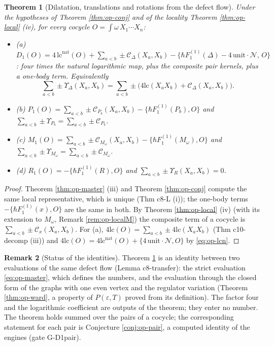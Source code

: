 \documentclass[11pt]{article}
\numberwithin{equation}{section}
\theoremstyle{plain}
\newtheorem{theorem}{Theorem}[section]
\theoremstyle{definition}
\newtheorem{remark}[theorem]{Remark}
\newcommand{\lc}{\mathrm{lc}}
\newcommand{\lcn}{\mathrm{lc}^{\mathrm{nat}}}
\newcommand{\Fc}{\mathcal N}
\newcommand{\Comp}{\mathcal C}
\begin{document}
\begin{theorem}[Dilatation, translations and rotations from the defect flow]
\label{thm:op-a}
Under the hypotheses of Theorem \ref{thm:op-conj} and of the locality Theorem \ref{thm:op-local} (iv), for every cocycle $O=\int\omega\,X_1\cdots X_n$:
\begin{itemize}
\item (a) $D_1(O)=4\,\lcn(O)+\sum_{a<b}\pm\Comp_\Delta(X_a,X_b)-\big\{\hbar F_1^{(1)}(\Delta)-4\,\mathrm{unit}\cdot\Fc,\,O\big\}$: four times the natural logarithmic map, plus the composite pair kernels, plus a one-body term. Equivalently
\begin{equation}
\sum_{a<b}\pm\Upsilon_\Delta(X_a,X_b)=\sum_{a<b}\pm\Big(4\lc(X_aX_b)+\Comp_\Delta(X_a,X_b)\Big).
\label{eq:op-aD}
\end{equation}
\item (b) $P_1(O)=\sum_{a<b}\pm\Comp_{P_b}(X_a,X_b)-\{\hbar F_1^{(1)}(P_b),O\}$ and $\sum_{a<b}\pm\Upsilon_{P_b}=\sum_{a<b}\pm\Comp_{P_b}$.
\item (c) $M_1(O)=\sum_{a<b}\pm\Comp_{M_\omega}(X_a,X_b)-\{\hbar F_1^{(1)}(M_\omega),O\}$ and $\sum_{a<b}\pm\Upsilon_{M_\omega}=\sum_{a<b}\pm\Comp_{M_\omega}$.
\item (d) $R_1(O)=-\{\hbar F_1^{(1)}(R),O\}$ and $\sum_{a<b}\pm\Upsilon_R(X_a,X_b)=0$.
\end{itemize}
\end{theorem}

\begin{proof}
Theorem \ref{thm:op-master} (iii) and Theorem \ref{thm:op-conj} compute the same local representative, which is unique (Thm c8-L (i)); the one-body terms $-\{\hbar F_1^{(1)}(x),O\}$ are the same in both. By Theorem \ref{thm:op-local} (iv) (with its extension to $M_\omega$, Remark \ref{rem:op-localM}) the composite term of a cocycle is $\sum_{a<b}\pm\Comp_x(X_a,X_b)$. For (a), $4\lc(O)=\sum_{a<b}\pm4\lc(X_aX_b)$ (Thm c10-decomp (iii)) and $4\lc(O)=4\lcn(O)+\{4\,\mathrm{unit}\cdot\Fc,O\}$ by \eqref{eq:op-lcn}.
\end{proof}

\begin{remark}[Status of the identities]
\label{rem:op-astatus}
Theorem \ref{thm:op-a} is an identity between two evaluations of the same defect flow (Lemma c8-transfer): the strict evaluation \eqref{eq:op-master}, which defines the numbers, and the evaluation through the closed form of the graphs with one even vertex and the regulator variation (Theorem \ref{thm:op-ward}, a property of $P(\varepsilon,T)$ proved from its definition). The factor four and the logarithmic coefficient are outputs of the theorem; they enter no number. The theorem holds summed over the pairs of a cocycle; the corresponding statement for each pair is Conjecture \ref{conj:op-pair}, a computed identity of the engines (gate G-D1pair).
\end{remark}
\end{document}
